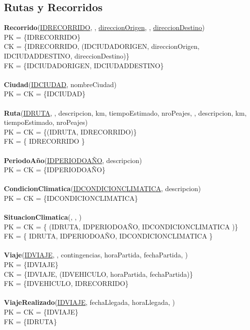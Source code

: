 \subsection{Rutas y Recorridos}
\textbf{Recorrido}(\underline{IDRECORRIDO},
,
\underline{direccionOrigen}, ,
\underline{direccionDestino})
\\
PK = \{IDRECORRIDO\} \\
CK = \{IDRECORRIDO, (IDCIUDADORIGEN, direccionOrigen, IDCIUDADDESTINO, direccionDestino)\} \\
FK = \{IDCIUDADORIGEN, IDCIUDADDESTINO\} \\
\\
\textbf{Ciudad}(\underline{IDCIUDAD}, nombreCiudad)
\\
PK = CK = \{IDCIUDAD\} \\
\\
\textbf{Ruta}(\underline{IDRUTA}, ,
descripcion, km, tiempoEstimado, nroPeajes, 
, descripcion, km, tiempoEstimado, nroPeajes) \\
PK = CK = \{(IDRUTA, IDRECORRIDO)\} \\
FK = \{ IDRECORRIDO \} \\
\\
\textbf{PeriodoA\~no}(\underline{IDPERIODOA\~NO}, descripcion) \\
PK = CK = \{IDPERIODOA\~NO\} \\
\\
\textbf{CondicionClimatica}(\underline{IDCONDICIONCLIMATICA}, descripcion) \\
PK = CK = \{IDCONDICIONCLIMATICA\} \\
\\
\textbf{SituacionClimatica}(, ,
) \\
PK = CK = \{ (IDRUTA, IDPERIODOA\~NO, IDCONDICIONCLIMATICA )\} \\
FK = \{ IDRUTA, IDPERIODOA\~NO, IDCONDICIONCLIMATICA \} \\
\\
\textbf{Viaje}(\underline{IDVIAJE}, , contingencias, 
horaPartida, fechaPartida, ) \\
PK = \{IDVIAJE\} \\
CK = \{IDVIAJE, (IDVEHICULO, horaPartida, fechaPartida)\} \\
FK = \{IDVEHICULO, IDRECORRIDO\} \\
\\
\textbf{ViajeRealizado}(\underline{IDVIAJE}, fechaLlegada, horaLlegada, )
\\
PK = CK = \{IDVIAJE\} \\
FK = \{IDRUTA\} \\
\\
